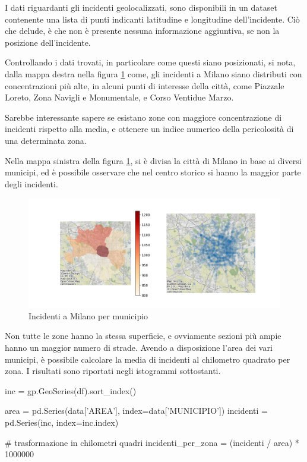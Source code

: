 \documentclass[a4paper,12pt]{report}
\begin{document}
I dati riguardanti gli incidenti geolocalizzati, sono disponibili in un dataset contenente una 
lista di punti indicanti latitudine e longitudine dell'incidente. 
Ciò che delude, è che non è presente nessuna informazione aggiuntiva, se non la posizione 
dell'incidente.

Controllando i dati trovati, in particolare come questi siano posizionati, 
si nota, dalla mappa destra nella figura \ref{fig:heatmap-municipi} come, 
gli incidenti a Milano siano distributi con concentrazioni più alte, 
in alcuni punti di interesse della città, come Piazzale Loreto, Zona Navigli 
e Monumentale, e Corso Ventidue Marzo.

Sarebbe interessante sapere se esistano zone con maggiore concentrazione di incidenti rispetto 
alla media, e ottenere un indice numerico della pericolosità di una determinata zona.

Nella mappa sinistra della figura \ref{fig:heatmap-municipi}, si è divisa la città di Milano 
in base ai diversi municipi, ed è possibile osservare che nel centro storico si hanno la 
maggior parte degli incidenti.

\begin{figure}
    \includegraphics[width=\linewidth]{../src/municipi_milano/incidenti_municipio.png}
    \caption{Incidenti a Milano per municipio}
    \label{fig:heatmap-municipi}
\end{figure}

Non tutte le zone hanno la stessa superficie, e ovviamente sezioni più ampie hanno un maggior 
numero di strade. Avendo a disposizione l'area dei vari municipi, 
è possibile calcolare la media di incidenti al chilometro quadrato per zona.
I risultati sono riportati negli istogrammi sottostanti.

\begin{code}    
inc = gp.GeoSeries(df).sort_index()

area = pd.Series(data['AREA'], index=data['MUNICIPIO'])
incidenti = pd.Series(inc, index=inc.index)

# trasformazione in chilometri quadri
incidenti_per_zona = (incidenti / area) * 1000000 
\end{code}
\end{document}
